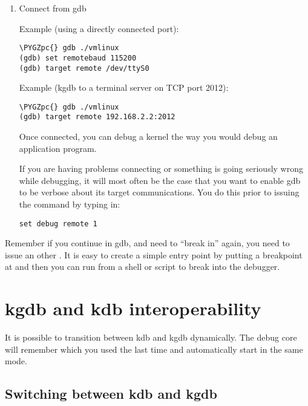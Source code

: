 \documentclass[a4paper,8pt,english]{sphinxmanual}
\def\PYGZpc{\char`\%}
\begin{document}
\begin{enumerate}
\begin{itemize}
\end{itemize}

\item {} 
Connect from gdb

Example (using a directly connected port):

\begin{Verbatim}[commandchars=\\\{\}]
\PYGZpc{} gdb ./vmlinux
(gdb) set remotebaud 115200
(gdb) target remote /dev/ttyS0
\end{Verbatim}

Example (kgdb to a terminal server on TCP port 2012):

\begin{Verbatim}[commandchars=\\\{\}]
\PYGZpc{} gdb ./vmlinux
(gdb) target remote 192.168.2.2:2012
\end{Verbatim}

Once connected, you can debug a kernel the way you would debug an
application program.

If you are having problems connecting or something is going seriously
wrong while debugging, it will most often be the case that you want
to enable gdb to be verbose about its target communications. You do
this prior to issuing the  command by typing in:

\begin{Verbatim}[commandchars=\\\{\}]
set debug remote 1
\end{Verbatim}

\end{enumerate}

Remember if you continue in gdb, and need to ``break in'' again, you need
to issue an other . It is easy to create a simple entry point by
putting a breakpoint at  and then you can run  from a
shell or script to break into the debugger.


\section{kgdb and kdb interoperability}
\label{dev-tools/kgdb:kgdb-and-kdb-interoperability}
It is possible to transition between kdb and kgdb dynamically. The debug
core will remember which you used the last time and automatically start
in the same mode.


\subsection{Switching between kdb and kgdb}
\label{dev-tools/kgdb:switching-between-kdb-and-kgdb}
\end{document}
